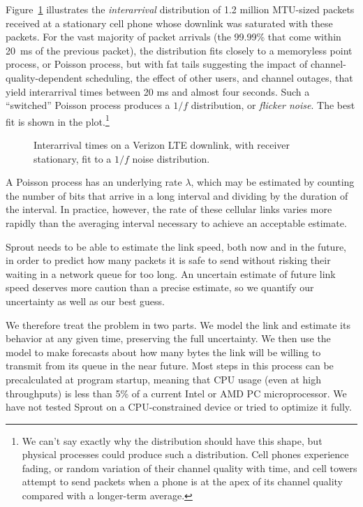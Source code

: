Figure~\ref{f:vzinter} illustrates the {\em interarrival} distribution
of 1.2 million MTU-sized packets received at a stationary cell phone
whose downlink was saturated with these packets. For the vast majority
of packet arrivals (the 99.99\% that come within 20~ms of the previous
packet), the distribution fits closely to a memoryless point process,
or Poisson process, but with fat tails suggesting the impact of
channel-quality-dependent scheduling, the effect of other users, and
channel outages, that yield interarrival times between 20 ms and
almost four seconds.  Such a ``switched'' Poisson process produces a
$1/f$ distribution, or {\em flicker noise}. The best fit is shown in
the plot.\footnote{We can't say exactly why the distribution should
  have this shape, but physical processes could produce such a
  distribution. Cell phones experience fading, or random variation of
  their channel quality with time, and cell towers attempt to send
  packets when a phone is at the apex of its channel quality compared
  with a longer-term average. }


\begin{figure}
\caption{Interarrival times on a Verizon LTE downlink, with receiver
  stationary, fit to a $1/f$ noise distribution.}

\hspace{\baselineskip}

\def\svgwidth{\columnwidth}

\label{f:vzinter}

\end{figure}

A Poisson process has an underlying rate $\lambda$, which may be
estimated by counting the number of bits that arrive in a long
interval and dividing by the duration of the interval. In practice,
however, the rate of these cellular links varies more rapidly than the
averaging interval necessary to achieve an acceptable estimate.

Sprout needs to be able to estimate the link speed, both now and in
the future, in order to predict how many packets it is safe to send
without risking their waiting in a network queue for too long. An
uncertain estimate of future link speed deserves more caution than a
precise estimate, so we quantify our uncertainty as well as
our best guess.

We therefore treat the problem in two parts. We model the link and
estimate its behavior at any given time, preserving the full
uncertainty. We then use the model to make forecasts about how many
bytes the link will be willing to transmit from its queue in the near
future. Most steps in this process can be precalculated at program
startup, meaning that CPU usage (even at high throughputs) is less
than 5\% of a current Intel or AMD PC microprocessor. We have not
tested Sprout on a CPU-constrained device or tried to optimize it
fully.

